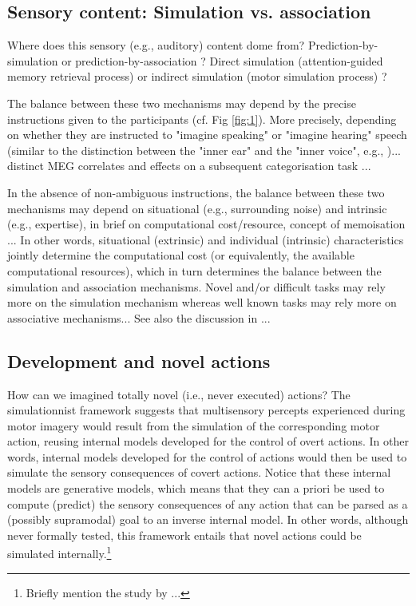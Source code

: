 \documentclass[utf8]{template/frontiersSCNS} %
\begin{document}
\subsection{Sensory content: Simulation vs. association}

Where does this sensory (e.g., auditory) content dome from? Prediction-by-simulation or prediction-by-association \citep{pickering_integrated_2013}? Direct simulation (attention-guided memory retrieval process) or indirect simulation (motor simulation process) \citep{tian_mental_2012, tian_effect_2013, li_corollary_2020, ma_distinct_2019}?

The balance between these two mechanisms may depend by the precise instructions given to the participants (cf. Fig \ref{fig:1}). More precisely, depending on whether they are instructed to "imagine speaking" or "imagine hearing" speech (similar to the distinction between the "inner ear" and the "inner voice", e.g., \cite{smith_subvocalization_1992})... distinct MEG correlates and effects on a subsequent categorisation task \citep{ma_distinct_2019}...

In the absence of non-ambiguous instructions, the balance between these two mechanisms may depend on situational (e.g., surrounding noise) and intrinsic (e.g., expertise), in brief on computational cost/resource, concept of memoisation \citep{dasgupta_memory_2021}... In other words, situational (extrinsic) and individual (intrinsic) characteristics jointly determine the computational cost (or equivalently, the available computational resources), which in turn determines the balance between the simulation and association mechanisms. Novel and/or difficult tasks may rely more on the simulation mechanism whereas well known tasks may rely more on associative mechanisms... See also the discussion in  \citep{nalborczyk_understanding_2019-1, nalborczyk_re-analysing_2020}...

\subsection{Development and novel actions}

How can we imagined totally novel (i.e., never executed) actions? The simulationnist framework suggests that multisensory percepts experienced during motor imagery would result from the simulation of the corresponding motor action, reusing internal models developed for the control of overt actions. In other words, internal models developed for the control of actions would then be used to simulate the sensory consequences of covert actions. Notice that these internal models are generative models, which means that they can a priori be used to compute (predict) the sensory consequences of any action that can be parsed as a (possibly supramodal) goal to an inverse internal model. In other words, although never formally tested, this framework entails that novel actions could be simulated internally.\footnote{Briefly mention the study by \cite{mulder_role_2004}...}
\end{document}
